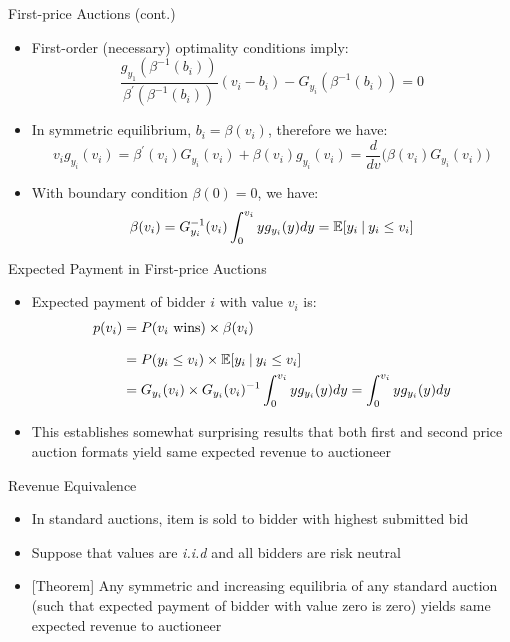 \documentclass[11pt,aspectratio=169,handout]{beamer}
\begin{document}
  \begin{frame}{First-price Auctions (cont.)}
   \begin{itemize}
    \item First-order (necessary) \alert{optimality conditions} imply\footnotemark{}:
    $$\frac{g_{y_1}(\beta^{-1}(b_i))}{\beta^\prime(\beta^{-1}(b_i))}(v_i-b_i)-G_{y_i}(\beta^{-1}(b_i))=0$$
    \item In symmetric equilibrium, $b_i = \beta (v_i)$, therefore we have:
     \begin{equation*}
      v_i g_{y_i}(v_i)=\beta^\prime(v_i)G_{y_i}(v_i)+\beta(v_i)g_{y_i}(v_i)=\frac{d}{dv}\big(\beta(v_i)G_{y_i}(v_i)\big)
     \end{equation*}
    \item With \alert{boundary condition} $\beta(0)=0$, we have: 
     \begin{equation*}
      \beta(v_i) = G_{y_i}^{-1}(v_i)\int_0^{v_i}yg_{y_i}(y)dy=\mathbb{E}[y_i \:\vert\: y_i\le v_i]
     \end{equation*}
   \end{itemize}
  \end{frame}
  
  
  \begin{frame}{Expected Payment in First-price Auctions}
   \begin{itemize}
    \item Expected payment of bidder $i$ with value $v_i$ is:
     \begin{align*}
      p(v_i)&=P(v_i\text{ wins})\times \beta(v_i)\\[0.8em]
      &=P(y_i\le v_i)\times \mathbb{E}[y_i\:\vert\: y_i\le v_i]\\
      &=G_{y_i}(v_i)\times G_{y_i}(v_i)^{-1}\int_0^{v_i}yg_{y_i}(y)dy =\int_0^{v_i}yg_{y_i}(y)dy
     \end{align*}
    \item This establishes somewhat surprising results that both first and second price auction formats yield \alert{same expected revenue} to auctioneer
   \end{itemize}
  \end{frame}
  
  
  \begin{frame}{Revenue Equivalence}
   \begin{itemize}[<+->]
   \setlength{\itemsep}{1.2em}
    \item In \alert{standard auctions}, item is sold to bidder with highest submitted bid
    \item Suppose that values are \textit{i.i.d} and all bidders are risk neutral
    \item \alert{[Theorem]} Any symmetric and increasing equilibria of any standard auction (such that expected payment of bidder with value zero is zero) yields same expected revenue to auctioneer  
   \end{itemize}
  \end{frame}
  
\end{document}
